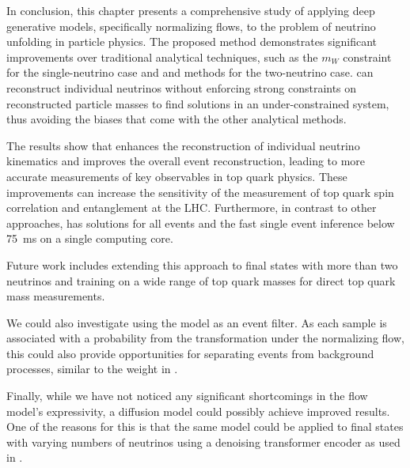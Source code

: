 In conclusion, this chapter presents a comprehensive study of applying deep generative models, specifically normalizing flows, to the problem of neutrino unfolding in particle physics.
The proposed \vvflows method demonstrates significant improvements over traditional analytical techniques, such as the $m_W$ constraint for the single-neutrino case and \vweight and \ellipse methods for the two-neutrino case.
\vvflows can reconstruct individual neutrinos without enforcing strong constraints on reconstructed particle masses to find solutions in an under-constrained system, thus avoiding the biases that come with the other analytical methods.

The results show that \vvflows enhances the reconstruction of individual neutrino kinematics and improves the overall event reconstruction, leading to more accurate measurements of key observables in top quark physics.
These improvements can increase the sensitivity of the measurement of top quark spin correlation and entanglement at the LHC.
Furthermore, in contrast to other approaches, \vvflows has solutions for all events and the fast single event inference below 75~ms on a single computing core.

Future work includes extending this approach to final states with more than two neutrinos and training on a wide range of top quark masses for direct top quark mass measurements.

We could also investigate using the model as an event filter.
As each sample is associated with a probability from the transformation under the normalizing flow, this could also provide opportunities for separating \ttbar events from background processes, similar to the weight in \vweight.

Finally, while we have not noticed any significant shortcomings in the flow model's expressivity, a diffusion model could possibly achieve improved results.
One of the reasons for this is that the same model could be applied to final states with varying numbers of neutrinos using a denoising transformer encoder as used in .
